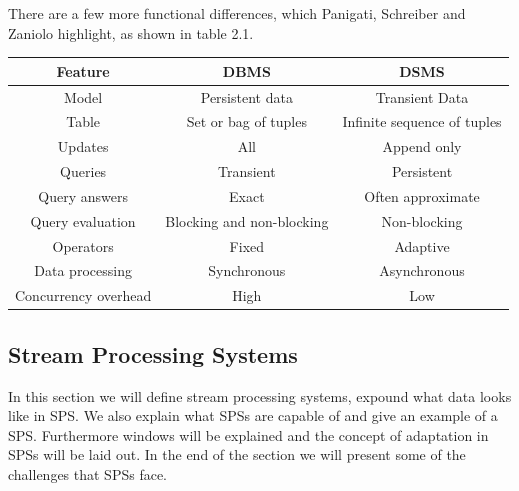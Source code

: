         \quad There are a few more functional differences, which Panigati, Schreiber and Zaniolo highlight, as shown in table 2.1.

        \begin{table}[h]
            \centering
            \label{tab:dbms-dsms}
            \begin{tabular}{|c|c|c|} \hline
                \textbf{Feature} & \textbf{DBMS} & \textbf{DSMS} \\ \hline
                Model & Persistent data & Transient Data \\ \hline
                Table & Set or bag of tuples & Infinite sequence of tuples \\ \hline
                Updates & All & Append only \\ \hline
                Queries & Transient & Persistent \\ \hline
                Query answers & Exact & Often approximate \\ \hline
                Query evaluation & Blocking and non-blocking & Non-blocking \\ \hline
                Operators & Fixed & Adaptive \\ \hline
                Data processing & Synchronous & Asynchronous \\ \hline
                Concurrency overhead  & High & Low \\ \hline
            \end{tabular}
        \end{table}

        \subsection{Stream Processing Systems}
        \label{sub:sps}

        In this section we will define stream processing systems, expound what data looks like in SPS. We also explain what SPSs
        are capable of and give an example of a SPS. Furthermore windows will be explained and the concept of adaptation in SPSs will be laid out.
        In the end of the section we will present some of the challenges that SPSs face.

